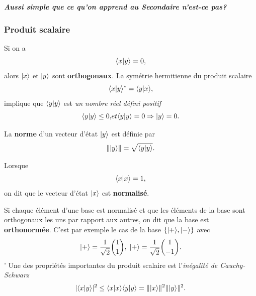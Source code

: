 \begin{footnotesize}
\begin{solution}
\begin{enumerate}
\begin{subequations}
\end{subequations}
 \end{enumerate}
\textbf{\emph{Aussi simple que ce qu'on apprend au Secondaire n'est-ce pas?}}
\end{solution}
\end{footnotesize}

\subsubsection{Produit scalaire}

Si on a
\begin{equation}
 \langle x\vert y\rangle=0,
\end{equation}
alors $\vert x\rangle$ et $\vert y\rangle$ sont \textbf{orthogonaux}. La symétrie hermitienne
du produit scalaire
\begin{equation}
 \langle x\vert y\rangle^{*}=\langle y\vert x\rangle,
\end{equation}
implique que $\langle y\vert y\rangle $ est \emph{un nombre réel défini positif}%
\begin{subequations}
\begin{align}
\langle y\ket{y} \leq 0,
\end{align}
et
\begin{align}
\langle y\ket{y} =0\Rightarrow\ket{y} =0.
\end{align}
\end{subequations}

La \textbf{norme} d'un vecteur d'état $\vert y\rangle $ est définie par%
\begin{equation}
\|\vert y\rangle\| =\sqrt{\langle y\vert y\rangle}.
\end{equation}

Lorsque
\begin{equation}
 \langle x\vert x\rangle=1,
\end{equation}
on dit que le vecteur d'état $\vert x\rangle$ est \textbf{normalisé}.

Si chaque élément d'une base est normalisé et que les éléments de la base sont
orthogonaux les uns par rapport aux autres, on dit que la base est
\textbf{orthonormée}. C'est par exemple le cas de la base $\{\vert+\rangle,\vert-\rangle\}$
avec
\begin{equation}
 \vert+\rangle=\frac{1}{\sqrt{2}}\binom{1}{1} ,\;
 \vert+\rangle=\frac{1}{\sqrt{2}}\binom{1}{-1}.
\end{equation} '
Une des propriétés importantes du produit scalaire est l'\emph{inégalité de
Cauchy-Schwarz}%
\begin{equation}
|\langle x\vert y\rangle|^{2}\leq\langle x\vert x\rangle\langle y\vert y\rangle
=\|\vert x\rangle\|^{2}\|\vert y\rangle\|^{2}.
\end{equation}

